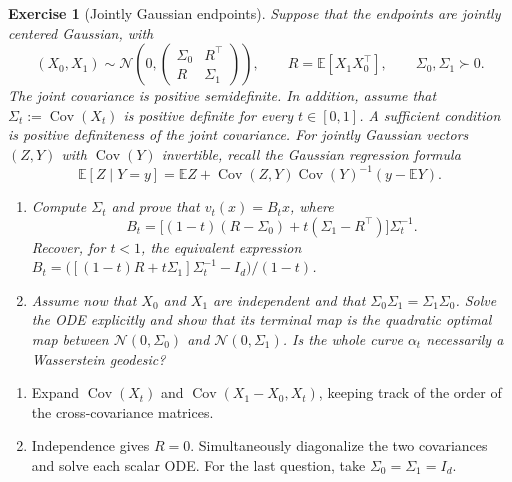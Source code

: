 \documentclass[11pt,a4paper]{article}
\theoremstyle{exostyle}
\newtheorem{exercise}{Exercise}
\newcommand{\R}{\mathbb{R}}
\newcommand{\EE}{\mathbb{E}}
\newcommand{\Cov}{\operatorname{Cov}}
\newcommand{\Gauss}{\mathcal{N}}
\begin{document}
\begin{exercise}[Jointly Gaussian endpoints]\label{ex-fm-gaussian}
Suppose that the endpoints are jointly centered Gaussian, with
\[
  (X_0,X_1)\sim\Gauss\!\left(0,
     \begin{pmatrix}\Sigma_0&R^\top\\R&\Sigma_1\end{pmatrix}\right),
  \qquad R=\EE[X_1X_0^\top],\qquad \Sigma_0,\Sigma_1\succ0.
\]
The joint covariance is positive semidefinite. In addition, assume
that $\Sigma_t:=\Cov(X_t)$ is positive definite for every $t\in[0,1]$.
A sufficient condition is positive definiteness of the joint covariance.
For jointly Gaussian vectors $(Z,Y)$ with $\Cov(Y)$ invertible,
recall the Gaussian regression formula
\[
  \EE[Z\mid Y=y]=\EE Z+\Cov(Z,Y)\Cov(Y)^{-1}(y-\EE Y).
\]
\begin{enumerate}[label=(\alph*)]
\item Compute $\Sigma_t$ and prove that $v_t(x)=B_tx$, where
\begin{equation}\label{eq-fm-gaussian-velocity}
  B_t=\big[(1-t)(R-\Sigma_0)+t(\Sigma_1-R^\top)\big]\Sigma_t^{-1}.
\end{equation}
  Recover, for $t<1$, the equivalent expression
  $B_t=\big([(1-t)R+t\Sigma_1]\Sigma_t^{-1}-I_d\big)/(1-t)$.
\item Assume now that $X_0$ and $X_1$ are independent and that
  $\Sigma_0\Sigma_1=\Sigma_1\Sigma_0$. Solve the ODE explicitly and
  show that its terminal map is the quadratic optimal map between
  $\Gauss(0,\Sigma_0)$ and $\Gauss(0,\Sigma_1)$.
  Is the whole curve $\alpha_t$ necessarily a Wasserstein geodesic?
\end{enumerate}
\end{exercise}
\begin{hints}
\begin{enumerate}[label=(\alph*)]
\item Expand $\Cov(X_t)$ and $\Cov(X_1-X_0,X_t)$, keeping track of
  the order of the cross-covariance matrices.
\item Independence gives $R=0$. Simultaneously diagonalize the two
  covariances and solve each scalar ODE. For the last question, take
  $\Sigma_0=\Sigma_1=I_d$.
\end{enumerate}
\end{hints}
\end{document}
